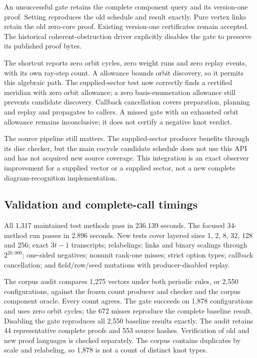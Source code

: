 An unsuccessful gate retains the complete component query and its
version-one proof. Setting  reproduces the old
schedule and result exactly.
Pure vertex links retain the old zero-core proof. Existing version-one
certificates remain accepted. The historical coherent-obstruction driver
explicitly disables the gate to preserve its published proof bytes.

The shortcut reports zero orbit cycles, zero weight runs and zero replay
events, with its own ray-step count. A  allowance bounds
orbit discovery, so it permits this algebraic path. The supplied-sector
test now correctly finds a certified meridian with zero orbit allowance;
a zero basis-enumeration allowance still prevents candidate discovery.
Callback cancellation covers preparation, planning and replay and propagates
to callers. A missed gate with an exhausted orbit allowance remains
inconclusive; it does not certify a negative knot verdict.

The source pipeline still matters. The supplied-sector producer benefits
through its disc checker, but the main cocycle candidate schedule does not
use this API and has not acquired new source coverage. This integration is
an exact observer improvement for a supplied vector or a supplied sector,
not a new complete diagram-recognition implementation.

\subsection{Validation and complete-call timings}

All 1,317 maintained test methods pass in 236.139 seconds. The focused
34-method run passes in 2.896 seconds. New tests cover layered sizes
1, 2, 8, 32, 128 and 256; exact $3t-1$ transcripts; relabelings; links and
binary scalings through $2^{20,000}$; one-sided negatives; nonunit rank-one
misses; strict option types; callback cancellation; and field/row/seed
mutations with producer-disabled replay.

The corpus audit compares 1,275 vectors under both periodic rules, or
2,550 configurations, against the frozen  count producer
and checker and the corpus component oracle. Every count agrees. The gate
succeeds on 1,878 configurations and uses zero orbit cycles; the 672 misses
reproduce the complete baseline result. Disabling the gate reproduces all
2,550 baseline results exactly. The audit retains 44 representative complete
proofs and 553 source hashes. Verification of old and new proof
languages is checked separately. The corpus contains duplicates by scale
and relabeling, so 1,878 is not a count of distinct knot types.

